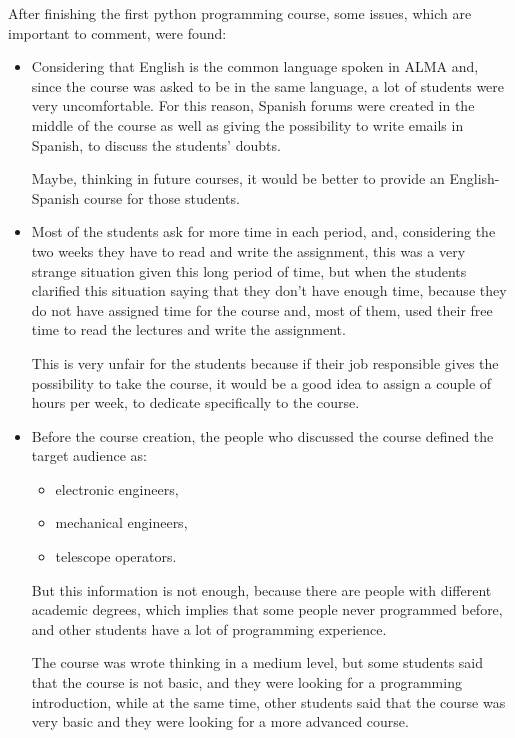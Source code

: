 \documentclass[letter, 10pt]{article}
\begin{document}
After finishing the first python programming course,
some issues, which are important to comment, were found:

\begin{itemize}
    \item Considering that English is the common language spoken in ALMA
          and, since the course was asked to be in the same language,
          a lot of students were very uncomfortable. For this reason,
          Spanish forums were created in the middle of the course as well as
          giving the possibility to write emails in Spanish,
          to discuss the students' doubts.

          Maybe, thinking in future courses, it would be better to provide an
          English-Spanish course for those students.

    \item Most of the students ask for more time in each period,
          and, considering the two weeks they have to read and write the assignment,
          this was a very strange situation given this long period of time,
          but when the students clarified this situation saying
          that they don't have enough time, because they do not
          have assigned time for the course and, most of them, used their
          free time to read the lectures and write the assignment.

          This is very unfair for the students because if their
          job responsible gives the possibility to take the course,
          it would be a good idea to assign a couple of hours per week,
          to dedicate specifically to the course.

    \item Before the course creation, the people who discussed the course
          defined the target audience as:
          \begin{itemize}
              \item electronic engineers,
              \item mechanical engineers,
              \item telescope operators.
          \end{itemize}

          But this information is not enough,
          because there are people with different academic degrees,
          which implies that some people never programmed before,
          and other students have a lot of programming experience.

          The course was wrote thinking in a medium level,
          but some students said that the course is not basic,
          and they were looking for a programming introduction,
          while at the same time, other students said that the course was
          very basic and they were looking for a more advanced course.


\end{itemize}
\end{document}
